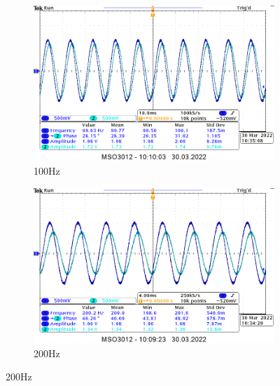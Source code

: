 {\begin{figure}[H]
    \centering    
    \begin{subfigure}[h]{0.4\textwidth}
        \includegraphics[width=\textwidth]{img_osciloscope/RC/RC_100Hz_cropped.png}
        \caption*{100Hz}
    \end{subfigure}
    \begin{subfigure}[h]{0.4\textwidth}
        \includegraphics[width=\textwidth]{img_osciloscope/RC/RC_200Hz_cropped.png}
        \caption*{200Hz}
    \end{subfigure}
\end{figure}

}
